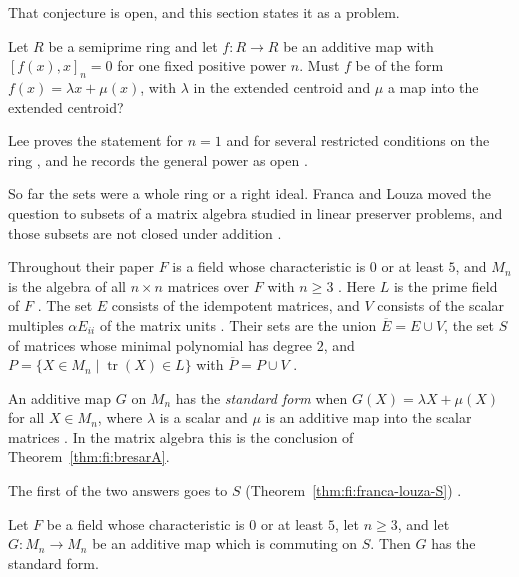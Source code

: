 That conjecture is open, and this section states it as a problem. %

\begin{problem}\label{prob:open:commuting}
Let $R$ be a semiprime ring and let $f\colon R\to R$ be an additive map with
$[f(x),x]_n=0$ for one fixed positive power $n$.
Must $f$ be of the form $f(x)=\lambda x+\mu(x)$, with $\lambda$ in the extended
centroid and $\mu$ a map into the extended centroid?
\end{problem}

Lee proves the statement for $n=1$ and for several restricted conditions on the
ring \cite[Theorem~L, p.~334]{LeeTK1997Centralizing}, and he records the
general power as open \cite[p.~334]{LeeTK1997Centralizing}.

So far the sets were a whole ring or a right ideal. Franca and Louza moved the
question to subsets of a matrix algebra studied in linear preserver problems, and
those subsets are not closed under addition \cite[p.~2540]{FrancaLouza2024}.

Throughout their paper $F$ is a field whose characteristic is $0$ or at least $5$, and
$M_n$ is the algebra of all $n\times n$ matrices over $F$ with $n\ge3$
\cite[p.~2541]{FrancaLouza2024}. Here $L$ is the prime field of $F$
\cite[p.~2541]{FrancaLouza2024}. The set $E$ consists of the idempotent matrices, and
$V$ consists of the scalar multiples $\alpha E_{ii}$ of the matrix units
\cite[p.~2541]{FrancaLouza2024}. Their sets are the union
$\overline{E}=E\cup V$, the set $S$ of matrices whose minimal polynomial has degree
$2$, and $P=\{X\in M_n\mid\operatorname{tr}(X)\in L\}$ with
$\overline{P}=P\cup V$ \cite[p.~2541]{FrancaLouza2024}.

An additive map $G$ on $M_n$ has the \emph{standard form} when
$G(X)=\lambda X+\mu(X)$ for all $X\in M_n$, where $\lambda$ is a scalar and $\mu$ is
an additive map into the scalar matrices \cite[p.~2540]{FrancaLouza2024}. In the
matrix algebra this is the conclusion of Theorem~\ref{thm:fi:bresarA}.

The first of the two answers goes to $S$ (Theorem~\ref{thm:fi:franca-louza-S}) \cite[p.~2550]{FrancaLouza2024}.

\begin{theorem}\label{thm:fi:franca-louza-S}
Let $F$ be a field whose characteristic is $0$ or at least $5$, let $n\ge3$, and let
$G\colon M_n\to M_n$ be an additive map which is commuting on $S$. Then $G$ has the
standard form.
\end{theorem}

